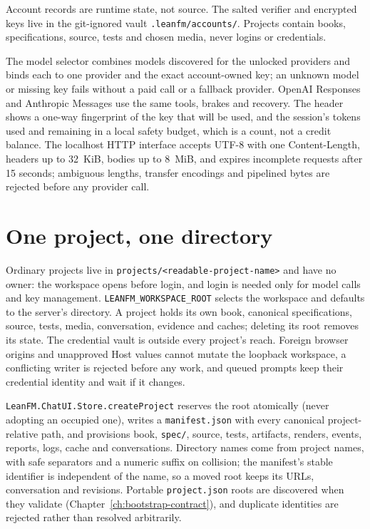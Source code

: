 Account records are runtime state, not source. The salted verifier and encrypted
keys live in the git-ignored vault \texttt{.leanfm/accounts/}. Projects contain
books, specifications, source, tests and chosen media, never logins or
credentials.

The model selector combines models discovered for the unlocked providers and binds
each to one provider and the exact account-owned key; an unknown model or missing
key fails without a paid call or a fallback provider. OpenAI Responses and
Anthropic Messages use the same tools, brakes and recovery. The header shows a
one-way fingerprint of the key that will be used, and the session's tokens used
and remaining in a local safety budget, which is a count, not a credit balance.
The localhost HTTP interface accepts UTF-8 with one Content-Length, headers up to
32~KiB, bodies up to 8~MiB, and expires incomplete requests after 15 seconds;
ambiguous lengths, transfer encodings and pipelined bytes are rejected before any
provider call.

\section{One project, one directory}
\label{sec:one-project-directory}

Ordinary projects live in \texttt{projects/<readable-project-name>} and have no
owner: the workspace opens before login, and login is needed only for model calls
and key management. \texttt{LEANFM\_WORKSPACE\_ROOT} selects the workspace and
defaults to the server's directory. A project holds its own book, canonical
specifications, source, tests, media, conversation, evidence and caches; deleting
its root removes its state. The credential vault is outside every project's
reach. Foreign browser origins and unapproved Host values cannot mutate the
loopback workspace, a conflicting writer is rejected before any work, and queued
prompts keep their credential identity and wait if it changes.

\texttt{LeanFM.ChatUI.Store.createProject} reserves the root atomically (never
adopting an occupied one), writes a \texttt{manifest.json} with every canonical
project-relative path, and provisions book, \texttt{spec/}, source, tests,
artifacts, renders, events, reports, logs, cache and conversations. Directory
names come from project names, with safe separators and a numeric suffix on
collision; the manifest's stable identifier is independent of the name, so a moved
root keeps its URLs, conversation and revisions. Portable \texttt{project.json}
roots are discovered when they validate (Chapter~\ref{ch:bootstrap-contract}), and
duplicate identities are rejected rather than resolved arbitrarily.

